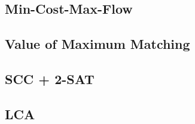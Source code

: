 \subsection{Min-Cost-Max-Flow}
%


\subsection{Value of Maximum Matching}


%

%


%

\subsection{SCC + 2-SAT}


\subsection{LCA}

